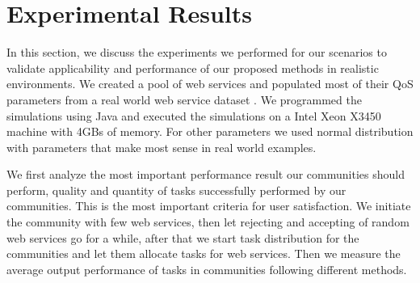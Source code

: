 \documentclass[10pt, conference, compsocconf]{IEEEtran}
\theoremstyle{plain}
\theoremstyle{definition}
\begin{document}
\section{Experimental Results}

In this section, we discuss the experiments we performed for our scenarios to validate applicability and performance of our proposed methods in realistic environments. We created a pool of web services and populated most of their QoS parameters from a real world web service dataset \cite{DBLP:conf/smc/Al-MasriM09a}. We programmed the simulations using Java and executed the simulations on a Intel Xeon X3450 machine with 4GBs of memory. For other parameters we used normal distribution with parameters that make most sense in real world examples.

We first analyze the most important performance result our communities should perform, quality and quantity of tasks successfully performed by our communities. This is the most important criteria for user satisfaction. We initiate the community with few web services, then let rejecting and accepting of random web services go for a while, after that we start task distribution for the communities and let them allocate tasks for web services. Then we measure the average output performance of tasks in communities following different methods. 
\end{document}
